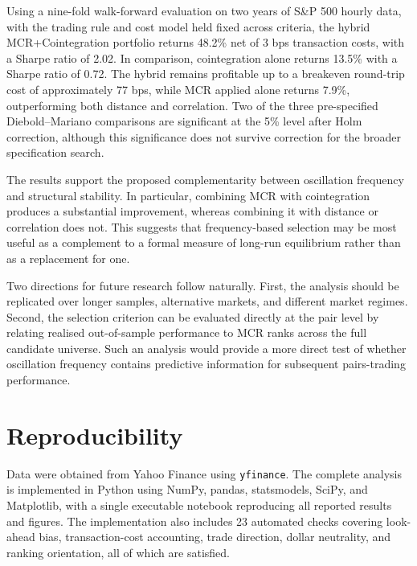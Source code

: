 \documentclass[11pt,a4paper]{article}
\theoremstyle{definition}
\begin{document}
Using a nine-fold walk-forward evaluation on two years of S\&P 500 hourly data,
with the trading rule and cost model held fixed across criteria, the hybrid
MCR+Cointegration portfolio returns 48.2\% net of 3 bps transaction costs, with
a Sharpe ratio of 2.02. In comparison, cointegration alone returns 13.5\% with
a Sharpe ratio of 0.72. The hybrid remains profitable up to a breakeven
round-trip cost of approximately 77 bps, while MCR applied alone returns 7.9\%,
outperforming both distance and correlation. Two of the three pre-specified
Diebold--Mariano comparisons are significant at the 5\% level after Holm
correction, although this significance does not survive correction for the
broader specification search.

The results support the proposed complementarity between oscillation frequency
and structural stability. In particular, combining MCR with cointegration
produces a substantial improvement, whereas combining it with distance or
correlation does not. This suggests that frequency-based selection may be most
useful as a complement to a formal measure of long-run equilibrium rather than
as a replacement for one.

Two directions for future research follow naturally. First, the analysis should
be replicated over longer samples, alternative markets, and different market
regimes. Second, the selection criterion can be evaluated directly at the pair
level by relating realised out-of-sample performance to MCR ranks across the
full candidate universe. Such an analysis would provide a more direct test of
whether oscillation frequency contains predictive information for subsequent
pairs-trading performance.

\section*{Reproducibility}

Data were obtained from Yahoo Finance using \texttt{yfinance}. The complete
analysis is implemented in Python using NumPy, pandas, statsmodels, SciPy, and
Matplotlib, with a single executable notebook reproducing all reported results
and figures. The implementation also includes 23 automated checks covering
look-ahead bias, transaction-cost accounting, trade direction, dollar neutrality,
and ranking orientation, all of which are satisfied.
\end{document}
